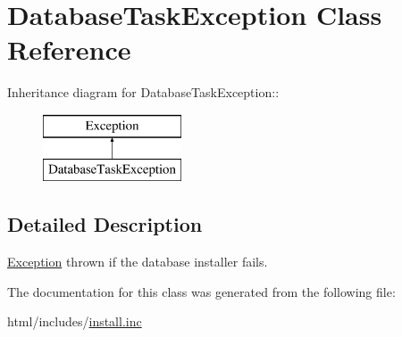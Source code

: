 \hypertarget{classDatabaseTaskException}{
\section{DatabaseTaskException Class Reference}
\label{classDatabaseTaskException}
}
Inheritance diagram for DatabaseTaskException::\begin{figure}[H]
\begin{center}
\leavevmode
\includegraphics[height=2cm]{classDatabaseTaskException}
\end{center}
\end{figure}


\subsection{Detailed Description}
\hyperlink{classException}{Exception} thrown if the database installer fails. 

The documentation for this class was generated from the following file:\begin{DoxyCompactItemize}
\item 
html/includes/\hyperlink{install_8inc}{install.inc}\end{DoxyCompactItemize}
